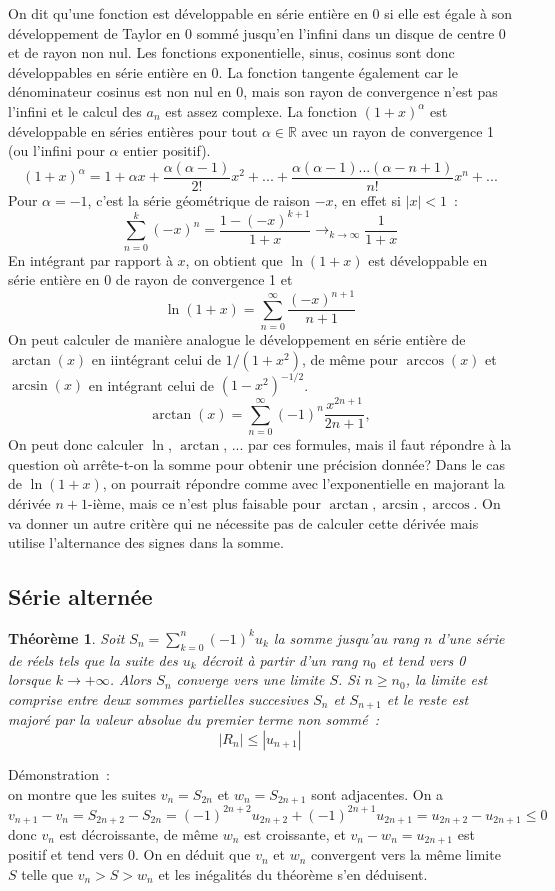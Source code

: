 \documentclass[a4paper,11pt]{article}
\newtheorem{thm}{Théorème}
\begin{document}
\begin{giacjshere}
On dit qu'une fonction est développable en série entière en 0 si
elle est égale à son développement de Taylor en 0 sommé jusqu'en l'infini
dans un disque de centre 0 et de rayon non nul. Les fonctions
exponentielle, sinus, cosinus sont donc développables en série entière en 0.
La fonction tangente également car le dénominateur cosinus est non nul en 0,
mais son rayon de convergence n'est pas l'infini et le calcul des $a_n$
est assez complexe.
La fonction $(1+x)^\alpha$ est développable en séries entières
pour tout $\alpha \in \mathbb{R}$ avec un rayon de convergence 1 (ou l'infini
pour $\alpha $ entier positif). 
\[ (1+x)^\alpha = 1 + \alpha x + \frac{\alpha (\alpha-1)}{2!} x^2 +
... + \frac{\alpha (\alpha-1) ... (\alpha -n +1)}{n!} x^n + ...\]
Pour $\alpha=-1$, c'est la série 
géométrique de raison $-x$, en effet si $|x|<1$~:
\[ \sum_{n=0}^k (-x)^n = \frac{1-(-x)^{k+1}}{1+x} 
\rightarrow_{k\rightarrow \infty} \frac{1}{1+x}
\]
En intégrant par rapport à $x$, on obtient que $\ln(1+x)$ est développable
en série entière en 0 de rayon de convergence 1 et
\[ \ln(1+x) = \sum_{n=0}^\infty \frac{(-x)^{n+1}}{n+1} \]
On peut calculer de manière analogue le développement en série entière
de $\arctan(x)$ en iintégrant celui de $1/(1+x^2)$, de même pour $\arccos(x)$
et $\arcsin(x)$ en intégrant celui de $(1-x^2)^{-1/2}$.
\[ \arctan(x)=\sum_{n=0}^\infty (-1)^{n} \frac{x^{2n+1}}{2n+1},
\]
On peut donc calculer $\ln$, $\arctan$, ... par ces formules, 
mais il faut répondre
à la question où arrête-t-on la somme pour obtenir une précision donnée? 
Dans le cas de $\ln(1+x)$,
on pourrait répondre comme avec l'exponentielle en majorant la dérivée
$n+1$-ième, mais ce n'est plus faisable pour $\arctan, \arcsin, \arccos$.
On va donner un autre critère qui ne nécessite pas
de calculer cette dérivée mais utilise l'alternance des signes
dans la somme.

\subsection{Série alternée}
\begin{thm}
Soit $S_n= \sum_{k=0}^n (-1)^k u_k$ la somme jusqu'au rang $n$ d'une
s\'erie de r\'eels tels que la suite des $u_k$ d\'ecroit \`a partir
d'un rang $n_0$ et tend vers 0
lorsque $k\rightarrow +\infty$. Alors $S_n$ converge vers une limite
$S$. Si $n\geq n_0$, la limite est comprise entre deux sommes
partielles succesives $S_n$ et $S_{n+1}$ et le reste est major\'e par
la valeur absolue du premier terme non somm\'e~:
\[ |R_n| \leq |u_{n+1}|\]
\end{thm}
D\'emonstration~:\\
on montre que les suites $v_n=S_{2n}$ et $w_n=S_{2n+1}$ sont
adjacentes. On a 
\[ v_{n+1}-v_n= S_{2n+2}-S_{2n}= (-1)^{2n+2} u_{2n+2} + (-1)^{2n+1}
u_{2n+1} = u_{2n+2}-u_{2n+1} \leq 0\]
donc $v_n$ est d\'ecroissante, de m\^eme $w_n$ est croissante,
et $v_n-w_n=u_{2n+1}$ est positif et tend vers 0. On en d\'eduit que
$v_n$ et $w_n$ convergent vers la m\^eme limite $S$ telle que
$v_n>S>w_n$ et les in\'egalit\'es du th\'eor\`eme s'en d\'eduisent.


\end{giacjshere}
\end{document}
